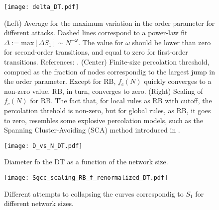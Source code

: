 \documentclass{article}
\begin{document}
\begin{figure}
\centering
\texttt{[image: delta\_DT.pdf]}
\caption{(Left) Average for the maximum variation in the order parameter for different attacks. Dashed lines correspond to a power-law fit $\Delta := \mathrm{max}[\Delta S_1] \sim N^{-\omega}$. The value for $\omega$ should be lower than zero for second-order transitions, and equal to zero for first-order transitions. References: \cite{Trevelyan2018DegreeInformation,Bastas2014a,Nagler2011a,Fan2020}. (Center) Finite-size percolation threshold, compued as the fraction of nodes correspondig to the largest jump in the order parameter. Except for RB, $f_c(N)$ quickly converges to a non-zero value. RB, in turn, converges to zero. (Right) Scaling of $f_c(N)$ for RB. The fact that, for local rules as RB with cutoff, the percolation threhold is non-zero, but for global rules, as RB, it goes to zero, resembles some explosive percolation models, such as the Spanning Cluster-Avoiding (SCA) method introduced in \cite{Cho2013}. }
\end{figure}

\begin{figure}
\centering
\texttt{[image: D\_vs\_N\_DT.pdf]}
\caption{Diameter fo the DT as a function of the network size.}
\end{figure}

\begin{figure}
\centering
\texttt{[image: Sgcc\_scaling\_RB\_f\_renormalized\_DT.pdf]}
\caption{Different attempts to collapsing the curves correspondig to $S_1$ for different network sizes.}
\end{figure}




\end{document}
